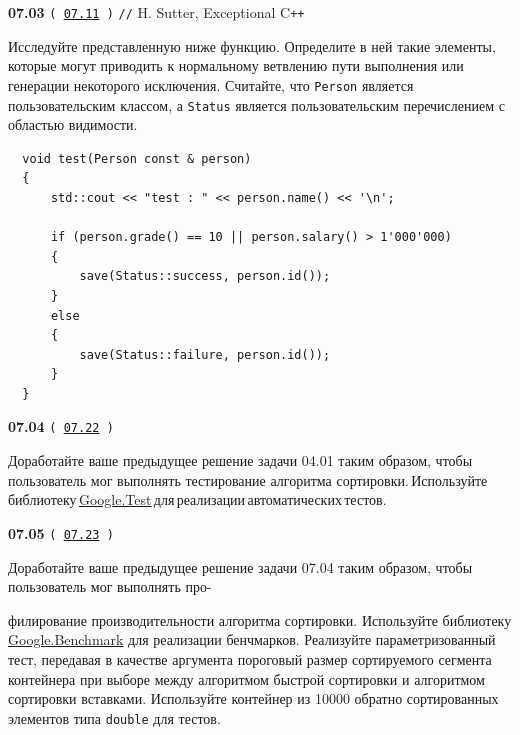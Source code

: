 \documentclass[a4paper,12pt]{article}
\begin{document}
\bigskip

{\large \textbf{07.03} \texttt{(\,\href{https://github.com/i-s-m-mipt/Education/blob/master/projects/examples/source/07.11.cpp}{07.11}\,)} \texttt{//} H. Sutter, Exceptional C\texttt{++}}

\bigskip

Исследуйте представленную ниже функцию. Определите в ней такие элементы, которые могут приводить к нормальному ветвлению пути выполнения или генерации некоторого исключения. Считайте, что \lstinline{Person} является пользовательским классом, а \lstinline{Status} является пользовательским перечислением с областью видимости.

\medskip

\begin{lstlisting}
  void test(Person const & person)
  {
      std::cout << "test : " << person.name() << '\n';
    
      if (person.grade() == 10 || person.salary() > 1'000'000)
      {
          save(Status::success, person.id());
      }
      else
      {
          save(Status::failure, person.id());
      }
  }
\end{lstlisting}

\bigskip

{\large \textbf{07.04} \texttt{(\,\href{https://github.com/i-s-m-mipt/Education/blob/master/projects/examples/source/07.22.cpp}{07.22}\,)}}

\bigskip

Доработайте ваше предыдущее решение задачи 04.01 таким образом, чтобы пользователь мог выполнять тестирование алгоритма сортировки.\,Используйте\,библиотеку\,\href{https://github.com/google/googletest}{Google.Test}\,для\,реализации\,автоматических\,тестов.

\bigskip

{\large \textbf{07.05} \texttt{(\,\href{https://github.com/i-s-m-mipt/Education/blob/master/projects/examples/source/07.23.cpp}{07.23}\,)}}

\bigskip

Доработайте ваше предыдущее решение задачи 07.04 таким образом, чтобы пользователь мог выполнять про- 

филирование производительности алгоритма сортировки. Используйте библиотеку \href{https://github.com/google/benchmark}{Google.Benchmark} для реализации бенчмарков. Реализуйте параметризованный тест, передавая в качестве аргумента пороговый размер сортируемого сегмента контейнера при выборе между алгоритмом быстрой сортировки и алгоритмом сортировки вставками. Используйте контейнер из 10000 обратно сортированных элементов типа \lstinline{double} для тестов.
\end{document}
